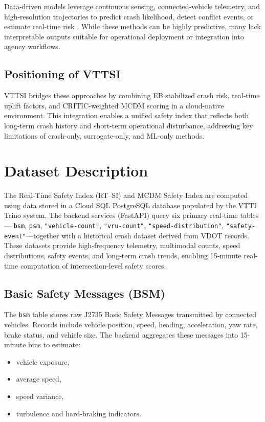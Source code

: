 \documentclass[conference]{IEEEtran}
\begin{document}
Data-driven models leverage continuous sensing, connected-vehicle telemetry, and
high-resolution trajectories to predict crash likelihood, detect conflict events, or
estimate real-time risk \cite{HUANG2020105392, Zhang31122025, Almutairi2025}. While
these methods can be highly predictive, many lack interpretable outputs suitable for
operational deployment or integration into agency workflows.

\subsection{Positioning of VTTSI}

VTTSI bridges these approaches by combining EB stabilized crash risk, real-time
uplift factors, and CRITIC-weighted MCDM scoring in a cloud-native environment. This
integration enables a unified safety index that reflects both long-term crash history
and short-term operational disturbance, addressing key limitations of crash-only,
surrogate-only, and ML-only methods.

\section{Dataset Description}
\label{sec:dataset}

The Real-Time Safety Index (RT--SI) and MCDM Safety Index are computed using 
data stored in a Cloud SQL PostgreSQL database populated by the VTTI Trino 
system. The backend services (FastAPI) query six primary real-time tables—
\texttt{bsm}, \texttt{psm}, \texttt{"vehicle-count"}, \texttt{"vru-count"}, 
\texttt{"speed-distribution"}, \texttt{"safety-event"}—together with a 
historical crash dataset derived from VDOT records.  
These datasets provide high-frequency telemetry, multimodal counts, speed 
distributions, safety events, and long-term crash trends, enabling 
15-minute real-time computation of intersection-level safety scores.

\subsection{Basic Safety Messages (BSM)}
The \texttt{bsm} table stores raw J2735 Basic Safety Messages transmitted by 
connected vehicles. Records include vehicle position, speed, heading, 
acceleration, yaw rate, brake status, and vehicle size.  
The backend aggregates these messages into 15-minute bins to estimate:
\begin{itemize}
    \item vehicle exposure,
    \item average speed,
    \item speed variance,
    \item turbulence and hard-braking indicators.
\end{itemize}
\end{document}
